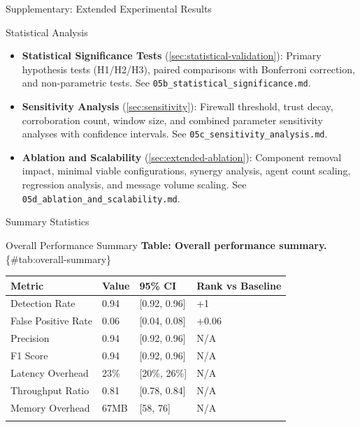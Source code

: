 \documentclass[
  ignorenonframetext,
]{beamer}
\newcounter{none} %
\begin{document}
\begin{frame}[fragile]{Supplementary: Extended Experimental Results}
\begin{block}{Statistical Analysis}
\begin{itemize}
\item
  \textbf{Statistical Significance Tests}
  (\cref{sec:statistical-validation}): Primary hypothesis tests
  (H1/H2/H3), paired comparisons with Bonferroni correction, and
  non-parametric tests. See \texttt{05b\_statistical\_significance.md}.
\item
  \textbf{Sensitivity Analysis} (\cref{sec:sensitivity}): Firewall
  threshold, trust decay, corroboration count, window size, and combined
  parameter sensitivity analyses with confidence intervals. See
  \texttt{05c\_sensitivity\_analysis.md}.
\item
  \textbf{Ablation and Scalability} (\cref{sec:extended-ablation}):
  Component removal impact, minimal viable configurations, synergy
  analysis, agent count scaling, regression analysis, and message volume
  scaling. See \texttt{05d\_ablation\_and\_scalability.md}.
\end{itemize}
\end{block}

\begin{block}{Summary Statistics}
\protect{}\label{sec:summary-stats}
\begin{block}{Overall Performance Summary}
\protect{}\label{sec:overall-summary}
\textbf{Table: Overall performance summary.} \{\#tab:overall-summary\}

{\def\LTcaptype{none} %
\begin{longtable}[]{@{}llll@{}}
\toprule\noalign{}
Metric & Value & 95\% CI & Rank vs Baseline \\
\midrule\noalign{}
\endhead
Detection Rate & 0.94 & {[}0.92, 0.96{]} & +1 \\
False Positive Rate & 0.06 & {[}0.04, 0.08{]} & +0.06 \\
Precision & 0.94 & {[}0.92, 0.96{]} & N/A \\
F1 Score & 0.94 & {[}0.92, 0.96{]} & N/A \\
Latency Overhead & 23\% & {[}20\%, 26\%{]} & N/A \\
Throughput Ratio & 0.81 & {[}0.78, 0.84{]} & N/A \\
Memory Overhead & 67MB & {[}58, 76{]} & N/A \\
\bottomrule\noalign{}
\end{longtable}
}
\end{block}


\end{block}
\end{frame}
\end{document}
